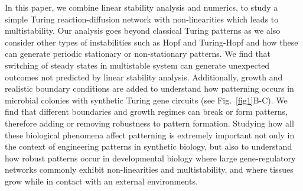 In this paper, we combine linear stability analysis and numerics, to study a simple Turing reaction-diffusion network with non-linearities which leads to multistability.
Our analysis goes beyond classical Turing patterns as we also consider other types of instabilities such as Hopf and Turing-Hopf and how these can generate periodic stationary or non-stationary patterns.
We find that switching of steady states in multistable system can generate unexpected outcomes not predicted by linear stability analysis.
Additionally, growth and realistic boundary conditions are added to understand how patterning occurs in microbial colonies with synthetic Turing gene circuits (see Fig.~\ref{fig1}B-C).
We find that different boundaries and growth regimes can break or form patterns, therefore adding or removing robustness to pattern formation.
Studying how all these biological phenomena affect patterning is extremely important not only in the context of engineering patterns in synthetic biology, but also to understand how robust patterns occur in developmental biology where large gene-regulatory networks commonly exhibit non-linearities and multistability, and where tissues grow while in contact with an external environments.


